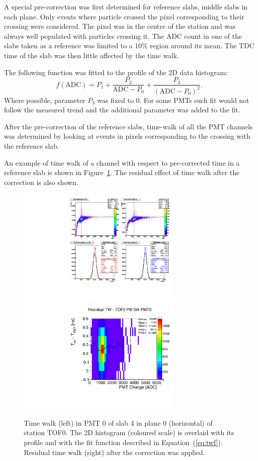 A special pre-correction was first determined for reference slabs,
middle slabs in each plane. Only events where particle crossed the
pixel corresponding to their crossing were considered. The pixel
was in the centre of the station and was always well populated with
particles crossing it.  The ADC count in one of the slabs taken as a
reference was limited to a $10\%$ region around its mean. The TDC time
of the slab was then little affected by the time walk.

The following function was fitted to the profile of the 2D data histogram:
%
\begin{equation}
  \newcommand{\ADC}{\text{ADC}}
  \label{eq:twf}
  f(\ADC) = P_1 + \frac{P_2}{\ADC - P_0} + \frac{P_3}{\left(\ADC - P_0\right)^2}.
\end{equation}
%
Where possible, parameter $P_3$ was fixed to 0. For some PMTs such fit
would not follow the measured trend and the additional parameter was
added to the fit.

After the pre-correction of the reference slabs, time-walk of all the
PMT channels was determined by looking at events in pixels
corresponding to the crossing with the reference slab.

An example of time walk of a channel with respect to pre-corrected
time in a reference slab is shown in Figure~\ref{fig:TW}. The residual
effect of time walk after the correction is also shown.

\begin{figure}
  \begin{center}
  \includegraphics[clip,trim=0 8.5cm 10cm 0, width=8cm]{01_tw_example}
  \includegraphics[width=8cm]{03_residual_tw_example} \\
  \caption{Time walk (left) in PMT 0 of slab 4 in plane 0 (horizontal)
    of station TOF0. The 2D histogram (coloured scale) is overlaid
    with its profile and with the fit function described in
    Equation~(\ref{eq:twf}).  Residual time walk (right) after the
    correction was applied.  }
  \label{fig:TW}
  \end{center}
\end{figure}



